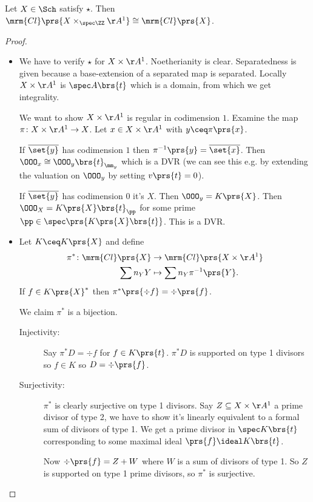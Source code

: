 \documentclass[10pt,a4paper,twoside,openany,hidelinks]{book}
\begin{document}
\begin{proposition}
Let $X \in \Sch$ satisfy $\star$.
Then $\mrm{Cl}\prs{X \times_{\spec \ZZ} \AA^1} \cong \mrm{Cl}\prs{X}$.
\end{proposition}

\begin{proof}
\begin{itemize}
\item We have to verify $\star$ for $X \times \AA^1$.
Noetherianity is clear. Separatedness is given because a base-extension of a separated map is separated.
Locally $X \times \AA^1$ is $\spec A\brs{t}$ which is a domain, from which we get integrality.

We want to show $X \times \AA^1$ is regular in codimension $1$.
Examine the map $\pi \colon X \times \AA^1 \to X$. Let $x \in X \times \AA^1$ with $y \ceq \pi\prs{x}$.

If $\overline{\set{y}}$ has codimension $1$ then $\pi^{-1}\prs{y} = \overline{\set{x}}$. Then $\OOO_x \cong \OOO_y\brs{t}_{\mm_y}$ which is a DVR (we can see this e.g. by extending the valuation on $\OOO_y$ by setting $v\prs{t} = 0$).

If $\overline{\set{y}}$ has codimension $0$ it's $X$. Then $\OOO_y = K\prs{X}$. Then $\OOO_X = K\prs{X}\brs{t}_\pp$ for some prime $\pp \in \spec \prs{K\prs{X}\brs{t}}$. This is a DVR.

\item
Let $K \ceq K\prs{X}$ and define
\begin{align*}
\pi^* \colon \mrm{Cl}\prs{X} &\to \mrm{Cl}\prs{X \times \AA^1} \\
\sum n_Y Y &\mapsto \sum n_Y \pi^{-1}\prs{Y} \text{.}
\end{align*}
If $f \in K\prs{X}^*$ then $\pi^*\prs{\div f} = \div \prs{f}$.

We claim $\pi^*$ is a bijection.

\begin{description}
\item[Injectivity:]
Say $\pi^* D = \div f$ for $f \in K\prs{t}$. $\pi^* D$ is supported on type 1 divisors so $f \in K$ so $D = \div \prs{f}$.
\item[Surjectivity:]
$\pi^*$ is clearly surjective on type 1 divisors. Say $Z \subseteq X \times \AA^1$ a prime divisor of type 2, we have to show it's linearly equivalent to a formal sum of divisors of type 1. We get a prime divisor in $\spec K\brs{t}$ corresponding to some maximal ideal $\prs{f} \ideal K\brs{t}$.

Now $\div\prs{f} = Z + W$ where $W$ is a sum of divisors of type 1. So $Z$ is supported on type 1 prime divisors, so $\pi^*$ is surjective.
\end{description}
\end{itemize}
\end{proof}
\end{document}
